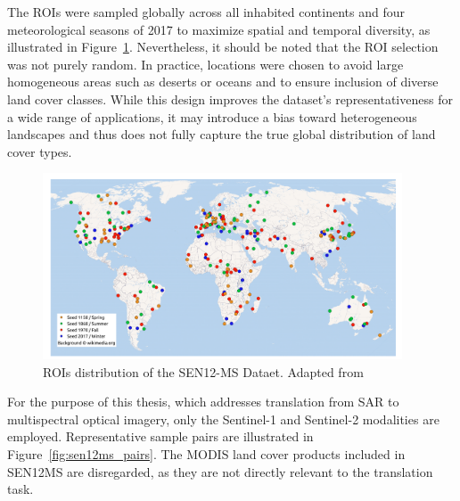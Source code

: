 The ROIs were sampled globally across all inhabited continents and four meteorological seasons of 2017 to maximize spatial and temporal diversity, as illustrated in Figure~\ref{fig:sen_12_ms_dist}. Nevertheless, it should be noted that the ROI selection was not purely random. In practice, locations were chosen to avoid large homogeneous areas such as deserts or oceans and to ensure inclusion of diverse land cover classes. While this design improves the dataset’s representativeness for a wide range of applications, it may introduce a bias toward heterogeneous landscapes and thus does not fully capture the true global distribution of land cover types.

\begin{figure}[h!]
  \centering
  \includegraphics[width=0.95\textwidth]{img/sen_12_ms_distribution.png}
  \caption[ROIs distribution of the SEN12-MS Dataet]{ROIs distribution of the SEN12-MS Dataet. Adapted from \cite{sen12ms_2019}}
  \label{fig:sen_12_ms_dist}
\end{figure}

For the purpose of this thesis, which addresses translation from SAR to multispectral optical imagery, only the Sentinel-1 and Sentinel-2 modalities are employed. Representative sample pairs are illustrated in Figure~\ref{fig:sen12ms_pairs}. The MODIS land cover products included in SEN12MS are disregarded, as they are not directly relevant to the translation task.

